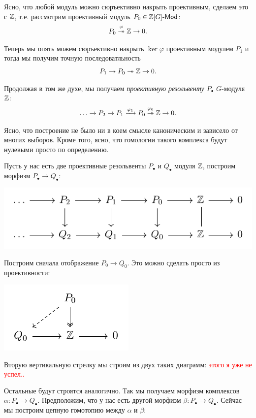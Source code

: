 	Ясно, что любой модуль можно сюръективно накрыть проективным, сделаем это с $\mathbb{Z}$, т.е. рассмотрим проективный модуль $P_0 \in \mathbb{Z}[G]\text{-}\mathsf{Mod}$:
	\[
		P_0 \overset{\varphi}\twoheadrightarrow \mathbb{Z} \to 0.
	\]

	Теперь мы опять можем сюръективно  накрыть $\ker{\varphi}$ проективным модулем $P_1$ и тогда мы получим точную последоватльность 
	\[
		P_1 \to P_0 \twoheadrightarrow \mathbb{Z} \to 0.
	\]

	Продолжая в том же духе, мы получаем \emph{проективную резольвенту $P_{\bullet}$} $G$-модуля $\mathbb{Z}$:
	\[
		\ldots \to P_2 \to P_1 \xrightarrow{\varphi_1} P_0 \overset{\varphi_0}\twoheadrightarrow \mathbb{Z} \to 0.
	\]

	Ясно, что построение не было ни в коем смысле каноническим и зависело от многих выборов. Кроме того, ясно, что гомологии такого комплекса будут нулевыми просто по определению. 

	Пусть у нас есть две проективные резольвенты $P_{\bullet}$ и $Q_{\bullet}$ модуля $\mathbb{Z}$, построим морфизм $P_{\bullet} \to Q_{\bullet}$:
	\begin{center}
			\includegraphics{lectures/5/pictures/pic_5.pdf}
		\end{center}

	Построим сначала отображение $P_0 \to Q_0$. Это можно сделать просто из проективности: 
	\begin{center}
			\includegraphics{lectures/5/pictures/pic_6.pdf}
		\end{center}


	Вторую вертикальную стрелку мы строим из двух таких диаграмм:  \textcolor{red}{этого я уже не успел..}


	Остальные будут строятся аналогично. Так мы получаем морфизм комплексов $\alpha\colon P_{\bullet} \to Q_{\bullet}$. Предположим, что у нас есть другой морфизм $\beta\colon P_{\bullet} \to Q_{\bullet}$. Сейчас мы построим цепную гомотопию между $\alpha$ и $\beta$: 

